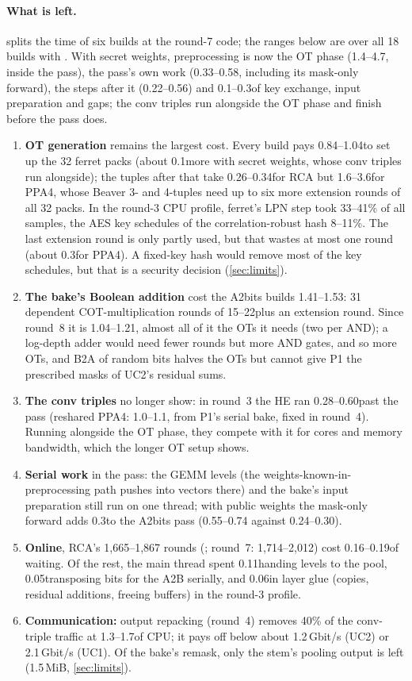 \paragraph{What is left.}  splits the time of six builds at the round-7 code; the ranges below are
over all 18 builds with . With secret weights, preprocessing is now the OT phase (1.4--4.7\s, inside
the pass), the pass's own work (0.33--0.58\s, including its mask-only forward), the steps after it (0.22--0.56\s) and
0.1--0.3\s of key exchange, input preparation and gaps; the conv triples run alongside the OT phase and finish before
the pass does.
\begin{enumerate}\itemsep1pt
\item \textbf{OT generation} remains the largest cost. Every build pays 0.84--1.04\s to set up the 32 ferret packs (about
  0.1\s more with secret weights, whose conv triples run alongside); the tuples after that take 0.26--0.34\s for RCA but
  1.6--3.6\s for PPA4, whose Beaver 3- and 4-tuples need up to six more extension rounds of all 32 packs. In the round-3
  CPU profile, ferret's LPN step took 33--41\% of all samples, the AES key schedules of the correlation-robust hash
  8--11\%. The last extension round is only partly used, but that wastes at most one round (about 0.3\s for PPA4). A
  fixed-key hash would remove most of the key schedules, but that is a security decision (\cref{sec:limits}).
\item \textbf{The bake's Boolean addition} cost the A2bits builds 1.41--1.53\s: 31 dependent COT-multiplication rounds
  of 15--22\ms plus an extension round. Since round~8 it is 1.04--1.21\s, almost all of it the OTs it needs (two per
  AND); a log-depth adder would need fewer rounds but more AND gates, and so more OTs, and B2A of random bits halves the
  OTs but cannot give P1 the prescribed masks of UC2's residual sums.
\item \textbf{The conv triples} no longer show: in round~3 the HE ran 0.28--0.60\s past the pass (reshared PPA4:
  1.0--1.1\s, from P1's serial bake, fixed in round~4). Running alongside the OT phase, they compete with it for cores
  and memory bandwidth, which the longer OT setup shows.
\item \textbf{Serial work} in the pass: the GEMM levels (the weights-known-in-preprocessing path pushes into vectors
  there) and the bake's input preparation still run on one thread; with public weights the mask-only forward adds
  0.3\s to the A2bits pass (0.55--0.74 against 0.24--0.30\s).
\item \textbf{Online}, RCA's 1,665--1,867 rounds (; round~7: 1,714--2,012) cost 0.16--0.19\s of waiting. Of the rest, the main thread spent
  0.11\s handing levels to the pool, 0.05\s transposing bits for the A2B serially, and 0.06\s in layer glue (copies,
  residual additions, freeing buffers) in the round-3 profile.
\item \textbf{Communication:} output repacking (round~4) removes 40\% of the conv-triple traffic at 1.3--1.7\s of
  CPU; it pays off below about 1.2\,Gbit/s (UC2) or 2.1\,Gbit/s (UC1). Of the bake's remask, only the stem's pooling
  output is left (1.5\,MiB, \cref{sec:limits}).
\end{enumerate}
